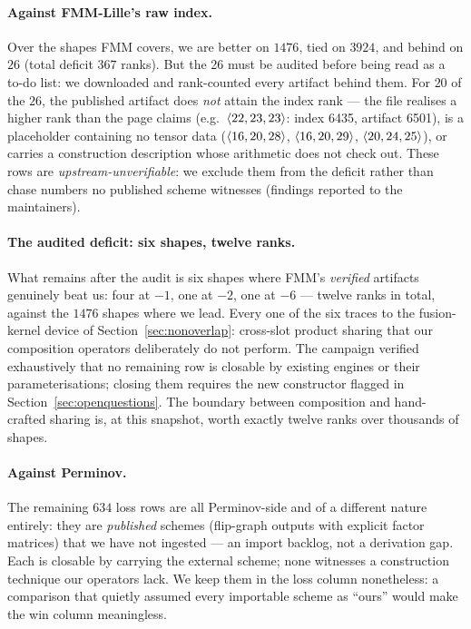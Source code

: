 \paragraph{Against FMM-Lille's raw index.} Over the shapes FMM covers,
we are better on \(1476\), tied on \(3924\), and behind on \(26\)
(total deficit \(367\) ranks). But the 26 must be audited before being
read as a to-do list: we downloaded and rank-counted every artifact
behind them. For \(20\) of the \(26\), the published artifact does
\emph{not} attain the index rank --- the file realises a higher rank
than the page claims (e.g.\ \(\langle 22, 23, 23 \rangle\): index 6435,
artifact 6501), is a placeholder containing no tensor data
(\(\langle 16, 20, 28 \rangle\), \(\langle 16, 20, 29 \rangle\),
\(\langle 20, 24, 25 \rangle\)), or carries a construction description
whose arithmetic does not check out. These rows are
\emph{upstream-unverifiable}: we exclude them from the deficit rather
than chase numbers no published scheme witnesses (findings reported to
the maintainers).

\paragraph{The audited deficit: six shapes, twelve ranks.} What
remains after the audit is six shapes where FMM's \emph{verified}
artifacts genuinely beat us: four at \(-1\), one at \(-2\), one at
\(-6\) --- twelve ranks in total, against the \(1476\) shapes where we
lead. Every one of the six traces to the fusion-kernel device of
Section~\ref{sec:nonoverlap}: cross-slot product sharing that our
composition operators deliberately do not perform. The campaign
verified exhaustively that no remaining row is closable by existing
engines or their parameterisations; closing them requires the new
constructor flagged in Section~\ref{sec:openquestions}. The boundary
between composition and hand-crafted sharing is, at this snapshot,
worth exactly twelve ranks over thousands of shapes.

\paragraph{Against Perminov.} The remaining \(634\) loss rows are all
Perminov-side and of a different nature entirely: they are
\emph{published} schemes (flip-graph outputs with explicit factor
matrices) that we have not ingested --- an import backlog, not a
derivation gap. Each is closable by carrying the external scheme; none
witnesses a construction technique our operators lack. We keep them in
the loss column nonetheless: a comparison that quietly assumed every
importable scheme as ``ours'' would make the win column meaningless.
